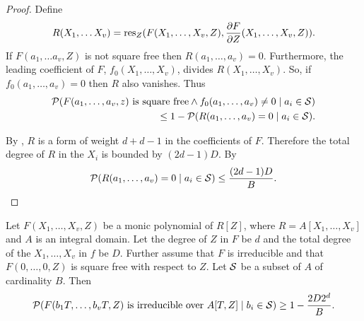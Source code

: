 \begin{proof}
Define 
\[
R(X_1, \ldots X_v) = \mathop{\rm res}\nolimits_Z(F(X_1, \ldots, X_v, Z), \frac{\partial
F}{\partial Z}(X_1, \ldots, X_v, Z)).
\]
If $F(a_1, \ldots a_v, Z)$ is not square free then $R(a_1, \ldots,
a_v) = 0$.  Furthermore, the leading coefficient of $F$, $f_0(X_1,
\ldots, X_v)$, divides $R(X_1, \ldots, X_v)$.  So, if $f_0(a_1, \ldots,
a_v) = 0$ then $R$ also vanishes.  Thus
\[
\begin{aligned}
{\cal P}(\mbox{$F(a_1, \ldots, a_v, z)$ is square free} 
\wedge f_0(a_1, \ldots, a_v) \not= 0\mid a_i \in {\cal S}) \\
\qquad \le 1 - {\cal P}(R(a_1, \ldots, a_v) = 0 \mid a_i \in {\cal S}).
\end{aligned}
\]

By , $R$ is a form of weight $d+d-1$ in
the coefficients of $F$.  Therefore the total degree of $R$ in the
$X_i$ is bounded by $(2d-1)D$.  By 
\[
{\cal P}(R(a_1, \ldots, a_v) = 0 \mid a_i \in {\cal S}) \le 
\frac{(2d-1)D}{B}.
\]
\end{proof}

\begin{proposition} \label{Monic:KIT:Prop}
Let $F(X_1, \ldots, X_v, Z)$ be a monic polynomial of $R[Z]$, where $R
= A[X_1, \ldots, X_v]$ and $A$ is an integral domain.  Let the degree
of $Z$ in $F$ be $d$ and the total degree of the $X_1, \ldots, X_v$ in
$f$ be $D$.  Further assume that $F$ is irreducible and that $F(0,
\ldots, 0, Z)$ is square free with respect to $Z$. Let ${\cal S}$ be a
subset of $A$ of cardinality $B$.  Then
\[
{\cal P}(\mbox{$F(b_1 T, \ldots, b_v T, Z)$ is irreducible over $A[T, Z]$}
   \mid b_i \in {\cal S}) \ge 1 - \frac{2D 2^{d}}{B}.
\]
\end{proposition}

